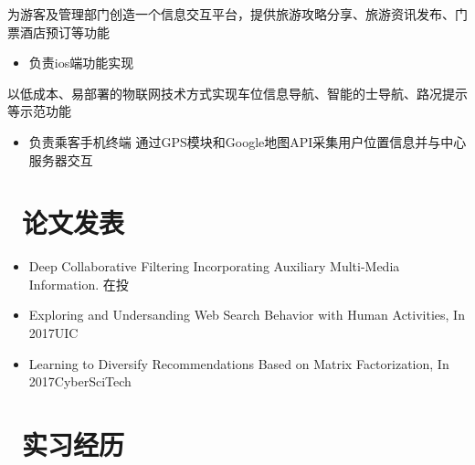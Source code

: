 \documentclass{resume}
\begin{document}
\begin{onehalfspacing}
为游客及管理部门创造一个信息交互平台，提供旅游攻略分享、旅游资讯发布、门票酒店预订等功能
\begin{itemize}
	\item 负责ios端功能实现
\end{itemize}
\end{onehalfspacing}
\begin{onehalfspacing}
以低成本、易部署的物联网技术方式实现车位信息导航、智能的士导航、路况提示等示范功能
\begin{itemize}
  \item 负责乘客手机终端  通过GPS模块和Google地图API采集用户位置信息并与中心服务器交互
\end{itemize}
\end{onehalfspacing}

\section{\faBook\ 论文发表}
\begin{itemize}
\item Deep Collaborative Filtering Incorporating Auxiliary Multi-Media Information. 在投
\item Exploring and Undersanding Web Search Behavior with Human Activities, In 2017UIC
\item Learning to Diversify Recommendations Based on Matrix Factorization, In 2017CyberSciTech
\end{itemize}

\section{\faUsers\ 实习经历}
\end{document}
